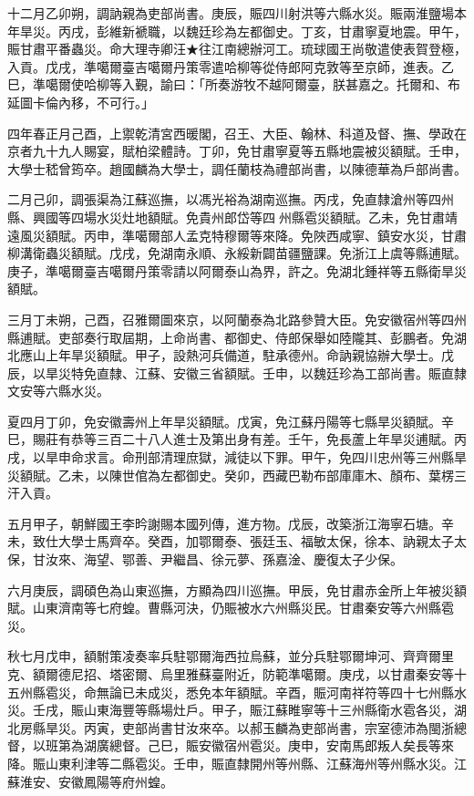 \begin{pinyinscope}
十二月乙卯朔，調訥親為吏部尚書。庚辰，賑四川射洪等六縣水災。賑兩淮鹽場本年旱災。丙戌，彭維新褫職，以魏廷珍為左都御史。丁亥，甘肅寧夏地震。甲午，賑甘肅平番蟲災。命大理寺卿汪★往江南總辦河工。琉球國王尚敬遣使表賀登極，入貢。戊戌，準噶爾臺吉噶爾丹策零遣哈柳等從侍郎阿克敦等至京師，進表。乙巳，準噶爾使哈柳等入覲，諭曰：「所奏游牧不越阿爾臺，朕甚嘉之。托爾和、布延圖卡倫內移，不可行。」

四年春正月己酉，上禦乾清宮西暖閣，召王、大臣、翰林、科道及督、撫、學政在京者九十九人賜宴，賦柏梁體詩。丁卯，免甘肅寧夏等五縣地震被災額賦。壬申，大學士嵇曾筠卒。趙國麟為大學士，調任蘭枝為禮部尚書，以陳德華為戶部尚書。

二月己卯，調張渠為江蘇巡撫，以馮光裕為湖南巡撫。丙戌，免直隸滄州等四州縣、興國等四場水災灶地額賦。免貴州郎岱等四州縣雹災額賦。乙未，免甘肅靖遠風災額賦。丙申，準噶爾部人孟克特穆爾等來降。免陜西咸寧、鎮安水災，甘肅柳溝衛蟲災額賦。戊戌，免湖南永順、永綏新闢苗疆鹽課。免浙江上虞等縣逋賦。庚子，準噶爾臺吉噶爾丹策零請以阿爾泰山為界，許之。免湖北鍾祥等五縣衛旱災額賦。

三月丁未朔，己酉，召雅爾圖來京，以阿蘭泰為北路參贊大臣。免安徽宿州等四州縣逋賦。吏部奏行取屆期，上命尚書、都御史、侍郎保舉如陸隴其、彭鵬者。免湖北應山上年旱災額賦。甲子，設熱河兵備道，駐承德州。命訥親協辦大學士。戊辰，以旱災特免直隸、江蘇、安徽三省額賦。壬申，以魏廷珍為工部尚書。賑直隸文安等六縣水災。

夏四月丁卯，免安徽壽州上年旱災額賦。戊寅，免江蘇丹陽等七縣旱災額賦。辛巳，賜莊有恭等三百二十八人進士及第出身有差。壬午，免長蘆上年旱災逋賦。丙戌，以旱申命求言。命刑部清理庶獄，減徒以下罪。甲午，免四川忠州等三州縣旱災額賦。乙未，以陳世倌為左都御史。癸卯，西藏巴勒布部庫庫木、顏布、葉楞三汗入貢。

五月甲子，朝鮮國王李昑謝賜本國列傳，進方物。戊辰，改築浙江海寧石塘。辛未，致仕大學士馬齊卒。癸酉，加鄂爾泰、張廷玉、福敏太保，徐本、訥親太子太保，甘汝來、海望、鄂善、尹繼昌、徐元夢、孫嘉淦、慶復太子少保。

六月庚辰，調碩色為山東巡撫，方顯為四川巡撫。甲辰，免甘肅赤金所上年被災額賦。山東濟南等七府蝗。曹縣河決，仍賑被水六州縣災民。甘肅秦安等六州縣雹災。

秋七月戊申，額駙策凌奏率兵駐鄂爾海西拉烏蘇，並分兵駐鄂爾坤河、齊齊爾里克、額爾德尼招、塔密爾、烏里雅蘇臺附近，防範準噶爾。庚戌，以甘肅秦安等十五州縣雹災，命無論已未成災，悉免本年額賦。辛酉，賑河南祥符等四十七州縣水災。壬戌，賑山東海豐等縣場灶戶。甲子，賑江蘇睢寧等十三州縣衛水雹各災，湖北房縣旱災。丙寅，吏部尚書甘汝來卒。以郝玉麟為吏部尚書，宗室德沛為閩浙總督，以班第為湖廣總督。己巳，賑安徽宿州雹災。庚申，安南馬郎叛人矣長等來降。賑山東利津等二縣雹災。壬申，賑直隸開州等州縣、江蘇海州等州縣水災。江蘇淮安、安徽鳳陽等府州蝗。


\end{pinyinscope}
